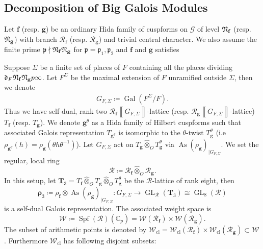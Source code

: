 \documentclass[10pt]{amsart}
\numberwithin{equation}{section}
\theoremstyle{definition}
\theoremstyle{remark} %
\newcommand{\bb}{\mathbb}
\newcommand{\bs}{\boldsymbol}
\newcommand{\mrm}{\mathrm}
\newcommand{\cal}{\mathcal}
\newcommand{\bbox}[1]{\left\llbracket#1\right\rrbracket}
\newcommand{\As}{\operatorname{As}}
\newcommand{\Gal}{\operatorname{Gal}}
\newcommand{\GL}[1]{\operatorname{GL}_{#1}}
\newcommand{\f}{\mathbf{f}}
\newcommand{\g}{\mathbf{g}}
\newcommand{\p}{\mathfrak{p}}
\newcommand{\R}{\mathcal{R}}
\newcommand{\T}{\mathbf{T}}
\newcommand{\W}{\mathcal{W}}
\begin{document}
	\subsection{Decomposition of Big Galois Modules}
	\label{subsection:Decomposition of Big Galois Modules}
	Let $ \f $ (resp. $ \g $) be an ordinary Hida family of cuspforms on $ \cal G $ of level $ \frak{N}_\f  $ (resp. $ \frak{N}_{\g} $)  with branch $ \R_\f $ (resp. $ \R_\g $) and trivial central character. We also assume the finite prime $ \p \nmid \frak{N}_{\f}\frak{N}_\g $ for $ \p = \p_1,\p_2 $ and $ \f $ and $ \g $ satisfies
	
	Suppose 
	$ \Sigma$ be a finite set of places of $ F $ containing all the places dividing $ \frak{d}_F \frak{N}_{\f} \frak{N}_{\g}p\infty  $. Let $ F^\Sigma $ be the maximal extension of $ F $ unramified outside $ \Sigma $, then we denote 
	\begin{align*}
		G_{F,\Sigma} \coloneqq \Gal(F^\Sigma/F).
	\end{align*}
	Thus we have self-dual, rank two $ \R_{\f}\bbox{G_{F,\Sigma}} $-lattice (resp. $ \R_{\g}\bbox{ G_{F,\Sigma}} $-lattice) $ T_\f $ (resp. $ T_\g $). We denote $ \g^\theta $ as a Hida family of Hilbert cuspforms such that associated Galois representation $ T_{\g^\theta} $ is isomorphic to the $ \theta $-twist $ T_\g^\theta $ (i.e $\rho_{\g^\theta}(h) = \rho_{\g}(\theta h\theta^{-1}) $).
	Let $ G_{F,\Sigma} $ act on $ T_\g \widehat{\otimes}_{O}T_\g^\theta $ via $ \As(\rho_{\g})_{|G_{F,\Sigma}} $. We set the regular, local ring
	$$ \R \coloneqq \R_{\f} \widehat{\otimes}_{O} \R_{\g} .$$
	In this setup, let $ \T_3 = T_{\f} \widehat{\otimes}_{O} T_{\g} \widehat{\otimes}_{O} T_{\g}^{\theta} $ be the $ \R $-lattice of rank eight, then $$ \bs{\rho}_3 \coloneqq \rho_{\f} \otimes \As(\rho_{\g})_{|G_{F,\Sigma}} \colon G_{F, \Sigma} \rightarrow \operatorname{GL}_{\R}(\T_3)\cong \GL{8}(\R) $$ is a self-dual Galois representation. The associated weight space is $$ \W\coloneqq\operatorname{Spf}(\R)(\bb{C}_p)= \W(\R_\f) \times \W(\R_\g). $$
	The subset of arithmetic points is denoted by $ \W_{\mrm{cl}} = \W_{\mrm{cl}}(\R_\f) \times \W_{\mrm{cl}}(\R_\g) \subset \W $. Furthermore $ \W_{\mrm{cl}} $ has following disjoint subsets:
\end{document}
